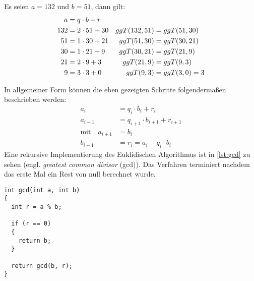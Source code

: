 \begin{example}
  Es seien $a=132$ und $b=51$, dann gilt:
  \begin{align*}
    a   & = q \cdot b + r   &               &                  \\
    132 & = 2 \cdot 51 + 30 & ggT(132,51) & = ggT(51,30)   \\
    51  & = 1 \cdot 30 + 21 & ggT(51,30)  & = ggT(30,21)   \\
    30  & = 1 \cdot 21 + 9  & ggT(30,21)  & = ggT(21,9)    \\
    21  & = 2 \cdot 9 + 3   & ggT(21,9)   & = ggT(9,3)     \\
    9   & = 3 \cdot 3 + 0   & ggT(9,3)    & = ggT(3,0) = 3
  \end{align*}
\end{example}
\noindent
In allgemeiner Form können die eben gezeigten Schritte folgendermaßen beschrieben werden:
\begin{equation}
  \label{eq:euklid}
  \begin{split}
    a_i     & = q_i \cdot b_i + r_i \\
    a_{i+1} & = q_{i+1} \cdot b_{i+1} + r_{i+1} \\
    \text{mit} \quad a_{i+1} & = b_i \\
    b_{i+1} & = r_i = a_i - q_i \cdot b_i
  \end{split}
\end{equation}
Eine rekursive Implementierung des Euklidischen Algorithmus ist in \autoref{lst:gcd}
zu sehen (engl. \textit{greatest common divisor} (gcd)).
Das Verfahren terminiert nachdem das erste Mal ein Rest von null berechnet wurde.
\begin{lstlisting}[caption=Euklidischer Algorithmus, label=lst:gcd]
int gcd(int a, int b)
{
  int r = a % b;
  
  if (r == 0)
  {
    return b;
  }
  
  return gcd(b, r);
}
\end{lstlisting}

